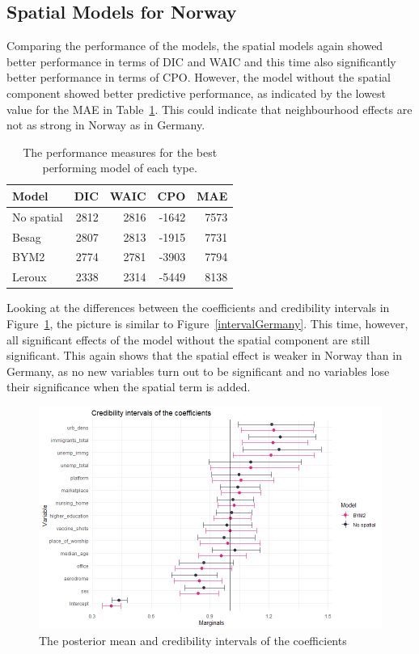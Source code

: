 \subsection{Spatial Models for Norway}
Comparing the performance of the models, the spatial models again showed better performance in terms of DIC and WAIC and this time also significantly better performance in terms of CPO. However, the model without the spatial component showed better predictive performance, as indicated by the lowest value for the MAE in Table~\ref{allNorway}. This could indicate that neighbourhood effects are not as strong in Norway as in Germany.
\begin{table}[H] 
\caption{The performance measures for the best performing model of each type. \label{allNorway}}
\begin{tabular}{l r r r r}
\toprule
\textbf{Model}	& \textbf{DIC}	& \textbf{WAIC} & \textbf{CPO} & \textbf{MAE} \\
\midrule
No spatial & 2812 & 2816 & -1642 & 7573 \\
Besag & 2807 & 2813 & -1915 & 7731 \\
BYM2 & 2774 & 2781 & -3903 & 7794\\
Leroux & 2338 & 2314 & -5449 & 8138\\
\bottomrule
\end{tabular}
\end{table}
Looking at the differences between the coefficients and credibility intervals in Figure~\ref{intervalNorway}, the picture is similar to Figure~\ref{intervalGermany}. This time, however, all significant effects of the model without the spatial component are still significant. This again shows that the spatial effect is weaker in Norway than in Germany, as no new variables turn out to be significant and no variables lose their significance when the spatial term is added.
\begin{figure}[H]
  \centering
  \includegraphics[width = \textwidth]{intervals_norway.png}
  \caption{The posterior mean and credibility intervals of the coefficients}
  \label{intervalNorway}
\end{figure}
